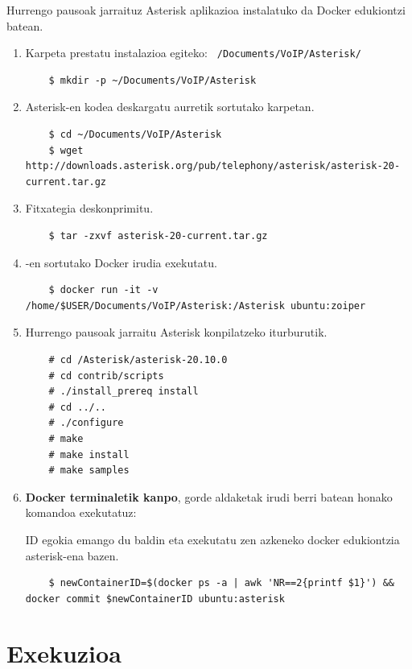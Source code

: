Hurrengo pausoak jarraituz Asterisk aplikazioa instalatuko da Docker edukiontzi batean.
\begin{enumerate}
    \item Karpeta prestatu instalazioa egiteko: \texttt{~/Documents/VoIP/Asterisk/}
    \begin{verbatim}
    $ mkdir -p ~/Documents/VoIP/Asterisk
    \end{verbatim}
    \item Asterisk-en kodea deskargatu aurretik sortutako karpetan.
    \begin{verbatim}
    $ cd ~/Documents/VoIP/Asterisk
    $ wget http://downloads.asterisk.org/pub/telephony/asterisk/asterisk-20-current.tar.gz
    \end{verbatim}
    \item Fitxategia deskonprimitu.
    \begin{verbatim}
    $ tar -zxvf asterisk-20-current.tar.gz
    \end{verbatim}
    \item {}-en sortutako Docker irudia exekutatu.
    \begin{verbatim}
    $ docker run -it -v /home/$USER/Documents/VoIP/Asterisk:/Asterisk ubuntu:zoiper
    \end{verbatim}
    \item Hurrengo pausoak jarraitu Asterisk konpilatzeko iturburutik.
    \begin{verbatim}
    # cd /Asterisk/asterisk-20.10.0
    # cd contrib/scripts
    # ./install_prereq install
    # cd ../..
    # ./configure
    # make
    # make install
    # make samples
    \end{verbatim}
    \item \textbf{Docker terminaletik kanpo}, gorde aldaketak irudi berri batean honako komandoa exekutatuz:
    \begin{important}
        ID egokia emango du baldin eta exekutatu zen azkeneko docker edukiontzia asterisk-ena bazen.
    \end{important}
    \begin{verbatim}
    $ newContainerID=$(docker ps -a | awk 'NR==2{printf $1}') && docker commit $newContainerID ubuntu:asterisk
    \end{verbatim}
\end{enumerate}

\section{Exekuzioa}

